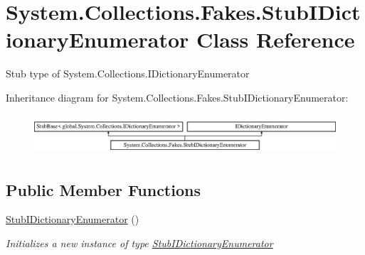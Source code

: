 \hypertarget{class_system_1_1_collections_1_1_fakes_1_1_stub_i_dictionary_enumerator}{\section{System.\-Collections.\-Fakes.\-Stub\-I\-Dictionary\-Enumerator Class Reference}
\label{class_system_1_1_collections_1_1_fakes_1_1_stub_i_dictionary_enumerator}
}


Stub type of System.\-Collections.\-I\-Dictionary\-Enumerator 


Inheritance diagram for System.\-Collections.\-Fakes.\-Stub\-I\-Dictionary\-Enumerator\-:\begin{figure}[H]
\begin{center}
\leavevmode
\includegraphics[height=1.509434cm]{class_system_1_1_collections_1_1_fakes_1_1_stub_i_dictionary_enumerator}
\end{center}
\end{figure}
\subsection*{Public Member Functions}
\begin{DoxyCompactItemize}
\item 
\hyperlink{class_system_1_1_collections_1_1_fakes_1_1_stub_i_dictionary_enumerator_ae649c2eac3dff6e016bc03e29d34933a}{Stub\-I\-Dictionary\-Enumerator} ()
\begin{DoxyCompactList}\small\item\em Initializes a new instance of type \hyperlink{class_system_1_1_collections_1_1_fakes_1_1_stub_i_dictionary_enumerator}{Stub\-I\-Dictionary\-Enumerator}\end{DoxyCompactList}\end{DoxyCompactItemize}
